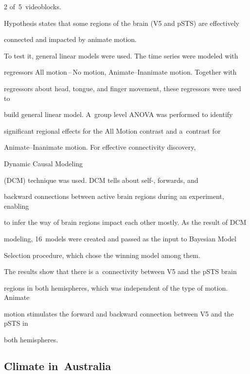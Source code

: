 \begin{multicols}{2}
of~5~videoblocks.





  Hypothesis states that some regions of the brain (V5 and pSTS) are effectively


connected and impacted by animate motion.





  To test it, general linear models were used. The time series were modeled with


regressors All motion\,--\,No motion, Animate--Inanimate motion. Together with


regressors about head, tongue, and finger movement, these regressors were used to


build general linear model. A~group level ANOVA was performed to identify


significant regional effects for the All Motion contrast and a~contrast for


Animate--Inanimate motion. For effective connectivity discovery,


 Dynamic Causal Modeling


(DCM) technique was used. DCM tells about self-, forwards, and


backward connections between active brain regions during an experiment, enabling


to infer the way of brain regions impact each other mostly. As the result of DCM


modeling, 16~models were created and passed as the input to Bayesian Model


Selection procedure, which chose the winning model among them.


{





}





  The results show that there is a~connectivity between V5 and the pSTS brain


regions in both hemispheres, which was independent of the type of motion. Animate


motion stimulates the forward and backward connection between V5 and the pSTS in


both hemispheres.





\subsection{Climate in~Australia}






\end{multicols}
